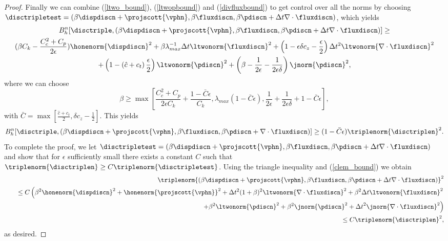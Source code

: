 \begin{proof}
 Finally we can combine (\ref{ltwo_bound}), (\ref{ltwopbound}) and (\ref{divfluxbound}) to get control over all the norms by choosing $\disctripletest=(\beta \dispdiscn + \projscott {\vphn}, \beta \fluxdiscn, \beta \pdiscn +   \Delta t \nabla \cdot \fluxdiscn   )$, which yields
\begin{multline}
  B_{h}^{n}[\disctriple,(\beta \dispdiscn + \projscott {\vphn},  \beta  \fluxdiscn, \beta \pdiscn +  \Delta t \nabla \cdot \fluxdiscn )] \geq  \\ (\beta C_{k}-\frac{C_{c}^{2}+C_{p}}{2\epsilon}) \honenorm{\dispdiscn}^{2}      +  \beta{\lambda_{max}^{-1}} {\Delta t} \ltwonorm{\fluxdiscn}^{2} + \left(1-{\epsilon \delta c_{z}  }-\frac{\epsilon}{2}\right)\Delta t^{2}\ltwonorm{\nabla \cdot \fluxdiscn}^{2}  \\ + \left(1-\left(\hat{c}+c_{t}\right) \frac{\epsilon}{2}\right) \ltwonorm{\pdiscn}^{2} + \left(\beta - \frac{1}{2 \epsilon } - \frac{1}{2 \epsilon \delta} \right) \jnorm{\pdiscn}^{2},
\end{multline}
where we can choose
\begin{equation*}
\beta \geq \max\left[ \frac{C^{2}_{c}+C_{p}}{2 \epsilon C_{k}} + \frac{1 -\bar{C} \epsilon }{ C_{k}}, \lambda_{max}\left( 1 - \bar{C} \epsilon \right),   \frac{1}{2 \epsilon } + \frac{1}{2 \epsilon \delta} +1- \bar{C} \epsilon \right],
\end{equation*}
with $\bar{C}=\max\left[  \frac{\hat{c}+{c}_{t}}{2} , \delta {c}_{z}   -\frac{1}{2} \right] $. This yields
\begin{equation*}
 B_{h}^{n}[\disctriple,(\beta \dispdiscn + \projscott {\vphn}, \beta \fluxdiscn, \beta \pdiscn + \nabla \cdot \fluxdiscn )] \geq  (1- \bar{C}\epsilon) \triplenorm{\disctriplen}^{2}.
\end{equation*}
To complete the proof, we let ${\disctripletest=(\beta \dispdiscn + \projscott {\vphn}, \beta \fluxdiscn, \beta \pdiscn +   \Delta t \nabla \cdot \fluxdiscn   )}$ and show that for $\epsilon$ sufficiently small there exists  a constant $C$ such that $\triplenorm{\disctriplen} \geq C \triplenorm{\disctripletest}$.
Using the triangle inequality and  (\ref{clem_bound}) we obtain
\begin{eqnarray*}
&&\triplenorm{(\beta \dispdiscn + \projscott {\vphn}, \beta \fluxdiscn, \beta \pdiscn + \Delta t\nabla \cdot \fluxdiscn   )}^2 \\
&&\quad \leq C \left( \beta^2\honenorm{\dispdiscn}^2 + \honenorm{\projscott {\vphn}}^2 + \Delta t^2 (1+\beta)^2 \ltwonorm{\nabla \cdot \fluxdiscn}^2 + \beta^2 {\Delta t} \ltwonorm{\fluxdiscn}^2 \right . \\
&&\qquad\qquad \left . + \beta^2\ltwonorm{\pdiscn}^2 + \beta^2 \jnorm{\pdiscn}^2 + {\Delta t}^2 \jnorm{\nabla \cdot \fluxdiscn}^2 \right) \\
&&\quad \leq C \triplenorm{\disctriplen}^2,
\end{eqnarray*}
as desired.
\end{proof}
